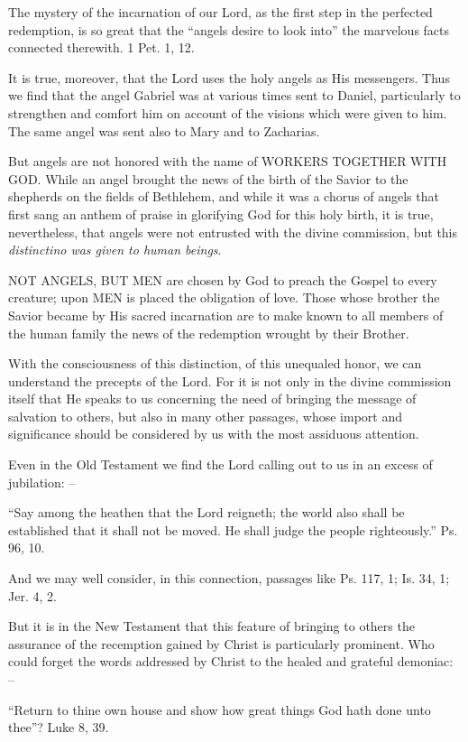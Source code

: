 \documentclass[
]{book}
\begin{document}
The mystery of the incarnation of our Lord, as the first step in the perfected redemption, is so great that the ``angels desire to look into'' the marvelous facts connected therewith. 1 Pet. 1, 12.

It is true, moreover, that the Lord uses the holy angels as His messengers. Thus we find that the angel Gabriel was at various times sent to Daniel, particularly to strengthen and comfort him on account of the visions which were given to him. The same angel was sent also to Mary and to Zacharias.

But angels are not honored with the name of WORKERS TOGETHER WITH GOD. While an angel brought the news of the birth of the Savior to the shepherds on the fields of Bethlehem, and while it was a chorus of angels that first sang an anthem of praise in glorifying God for this holy birth, it is true, nevertheless, that angels were not entrusted with the divine commission, but this \emph{distinctino was given to human beings}.

NOT ANGELS, BUT MEN are chosen by God to preach the Gospel to every creature; upon MEN is placed the obligation of love. Those whose brother the Savior became by His sacred incarnation are to make known to all members of the human family the news of the redemption wrought by their Brother.

With the consciousness of this distinction, of this unequaled honor, we can understand the precepts of the Lord. For it is not only in the divine commission itself that He speaks to us concerning the need of bringing the message of salvation to others, but also in many other passages, whose import and significance should be considered by us with the most assiduous attention.

Even in the Old Testament we find the Lord calling out to us in an excess of jubilation: --

``Say among the heathen that the Lord reigneth; the world also shall be established that it shall not be moved. He shall judge the people righteously.'' Ps. 96, 10.

And we may well consider, in this connection, passages like Ps. 117, 1; Is. 34, 1; Jer. 4, 2.

But it is in the New Testament that this feature of bringing to others the assurance of the recemption gained by Christ is particularly prominent. Who could forget the words addressed by Christ to the healed and grateful demoniac: --

``Return to thine own house and show how great things God hath done unto thee''? Luke 8, 39.
\end{document}
